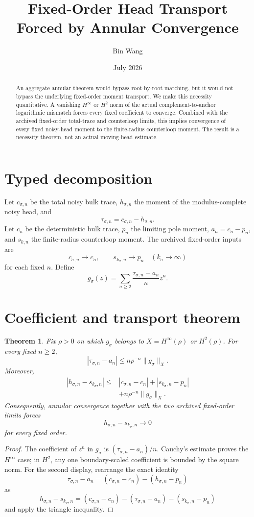 \documentclass[11pt]{article}
\title{Fixed-Order Head Transport Forced by Annular Convergence}
\author{Bin Wang}\date{July 2026}
\newtheorem{theorem}{Theorem}[section]
\theoremstyle{remark}\newtheorem{remark}[theorem]{Remark}
\begin{document}
\maketitle
\begin{abstract}
An aggregate annular theorem would bypass root-by-root matching, but it would
not bypass the underlying fixed-order moment transport.  We make this
necessity quantitative.  A vanishing $H^\infty$ or $H^2$ norm of the actual
complement-to-anchor logarithmic mismatch forces every fixed coefficient to
converge.  Combined with the archived fixed-order total-trace and
counterloop limits, this implies convergence of every fixed noisy-head
moment to the finite-radius counterloop moment.  The result is a necessity
theorem, not an actual moving-head estimate.
\end{abstract}

\section{Typed decomposition}
Let $c_{\sigma,n}$ be the total noisy bulk trace, $h_{\sigma,n}$ the moment
of the modulus-complete noisy head, and
\[
 \tau_{\sigma,n}=c_{\sigma,n}-h_{\sigma,n}.
\]
Let $c_n$ be the deterministic bulk trace, $p_n$ the limiting pole moment,
$a_n=c_n-p_n$, and $s_{k,n}$ the finite-radius counterloop moment.  The
archived fixed-order inputs are
\[
 c_{\sigma,n}\to c_n,\qquad s_{k_\sigma,n}\to p_n
 \quad(k_\sigma\to\infty)
\]
for each fixed $n$.  Define
\[
 g_\sigma(z)=\sum_{n\ge2}
 \frac{\tau_{\sigma,n}-a_n}{n}z^n.
\]

\section{Coefficient and transport theorem}
\begin{theorem}\label{thm:necessity}
Fix $\rho>0$ on which $g_\sigma$ belongs to
$X=H^\infty(\rho)$ or $H^2(\rho)$.  For every fixed $n\ge2$,
\[
 |\tau_{\sigma,n}-a_n|
 \le n\rho^{-n}\|g_\sigma\|_X.
\]
Moreover,
\begin{align*}
 |h_{\sigma,n}-s_{k_\sigma,n}|
 \le{}& |c_{\sigma,n}-c_n|
 +|s_{k_\sigma,n}-p_n|\\
 &+n\rho^{-n}\|g_\sigma\|_X.
\end{align*}
Consequently, annular convergence together with the two archived fixed-order
limits forces
\[
 h_{\sigma,n}-s_{k_\sigma,n}\longrightarrow0
\]
for every fixed order.
\end{theorem}
\begin{proof}
The coefficient of $z^n$ in $g_\sigma$ is
$(\tau_{\sigma,n}-a_n)/n$.  Cauchy's estimate proves the $H^\infty$ case;
in $H^2$, any one boundary-scaled coefficient is bounded by the square norm.
For the second display, rearrange the exact identity
\[
 \tau_{\sigma,n}-a_n
 =(c_{\sigma,n}-c_n)-(h_{\sigma,n}-p_n)
\]
as
\[
 h_{\sigma,n}-s_{k_\sigma,n}
 =(c_{\sigma,n}-c_n)-(\tau_{\sigma,n}-a_n)
 -(s_{k_\sigma,n}-p_n)
\]
and apply the triangle inequality.
\end{proof}
\end{document}
